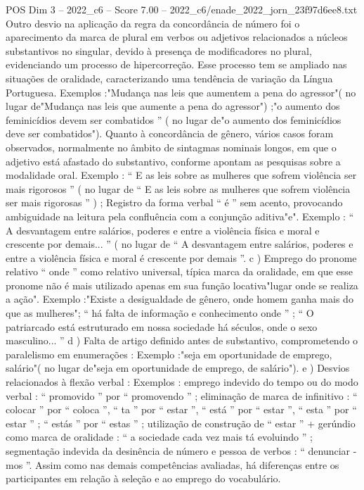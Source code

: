 \begin{textsample}{POS Dim 3 – 2022\_c6 – Score 7.00 – 2022\_c6/enade\_2022\_jorn\_23f97d6ee8.txt}
Outro desvio na aplicação da regra da concordância de número foi o aparecimento da marca de plural em verbos ou adjetivos relacionados a núcleos substantivos no singular, devido à presença de modificadores no plural, evidenciando um processo de hipercorreção.
Esse processo tem se ampliado nas situações de oralidade, caracterizando uma tendência de variação da Língua Portuguesa.
Exemplos :"Mudança nas leis que aumentem a pena do agressor"( no lugar de"Mudança nas leis que aumente a pena do agressor") ;"o aumento dos feminicídios devem ser combatidos ” ( no lugar de"o aumento dos feminicídios deve ser combatidos").
Quanto à concordância de gênero, vários casos foram observados, normalmente no âmbito de sintagmas nominais longos, em que o adjetivo está afastado do substantivo, conforme apontam as pesquisas sobre a modalidade oral.
Exemplo : “ E as leis sobre as mulheres que sofrem violência ser mais rigorosos ” ( no lugar de “ E as leis sobre as mulheres que sofrem violência ser mais rigorosas ” ) ; Registro da forma verbal “ é ” sem acento, provocando ambiguidade na leitura pela confluência com a conjunção aditiva"e".
Exemplo : “ A desvantagem entre salários, poderes e entre a violência física e moral e crescente por demais... ” ( no lugar de “ A desvantagem entre salários, poderes e entre a violência física e moral é crescente por demais ”. c ) Emprego do pronome relativo “ onde ” como relativo universal, típica marca da oralidade, em que esse pronome não é mais utilizado apenas em sua função locativa"lugar onde se realiza a ação".
Exemplo :"Existe a desigualdade de gênero, onde homem ganha mais do que as mulheres"; “ há falta de informação e conhecimento onde ” ; “ O patriarcado está estruturado em nossa sociedade há séculos, onde o sexo masculino... ” d ) Falta de artigo definido antes de substantivo, comprometendo o paralelismo em enumerações : Exemplo :"seja em oportunidade de emprego, salário"( no lugar de"seja em oportunidade de emprego, de salário"). e ) Desvios relacionados à flexão verbal : Exemplos : emprego indevido do tempo ou do modo verbal : “ promovido ” por “ promovendo ” ; eliminação de marca de infinitivo : “ colocar ” por “ coloca ”, “ ta ” por “ estar ”, “ está ” por “ estar ”, “ esta ” por “ estar ” ; “ estás ” por “ estas ” ; utilização de construção de “ estar ” + gerúndio como marca de oralidade : “ a sociedade cada vez mais tá evoluindo ” ; segmentação indevida da desinência de número e pessoa de verbos : “ denunciar -mos ”.
Assim como nas demais competências avaliadas, há diferenças entre os participantes em relação à seleção e ao emprego do vocabulário.

\end{textsample}
